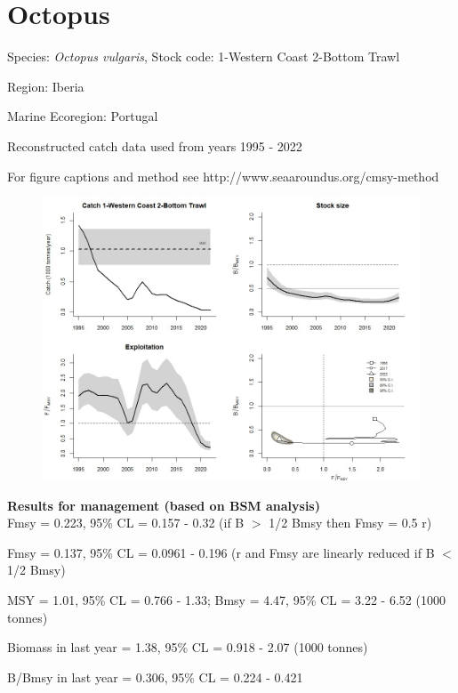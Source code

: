 \documentclass[12pt,a4paper]{article}\usepackage[]{graphicx}\usepackage[]{xcolor}
\begin{document}
    \section*{Octopus}


    Species: \emph{Octopus vulgaris}, Stock code: 1-Western Coast 2-Bottom Trawl

Region: Iberia

Marine Ecoregion: Portugal

Reconstructed catch data used from years 1995 - 2022 

 For figure captions and method see http://www.seaaroundus.org/cmsy-method

    \begin{figure}[ht]
    \centering
    \includegraphics[width=1.00\textwidth ext=.jpg type=jpg]{1-Western Coast 2-Bottom Trawl_MAN.jpg}
    \end{figure}

    \textbf{Results for management (based on BSM analysis)}\\

Fmsy = 0.223, 95\% CL = 0.157 - 0.32 (if B $>$ 1/2 Bmsy then Fmsy = 0.5 r)

Fmsy = 0.137, 95\% CL = 0.0961 - 0.196 (r and Fmsy are linearly reduced if B $<$ 1/2 Bmsy)

MSY = 1.01,  95\% CL = 0.766 - 1.33; Bmsy = 4.47,  95\% CL = 3.22 - 6.52 (1000 tonnes)

Biomass in last year = 1.38, 95\% CL = 0.918 - 2.07 (1000 tonnes)

B/Bmsy in last year = 0.306, 95\% CL = 0.224 - 0.421
\end{document}
